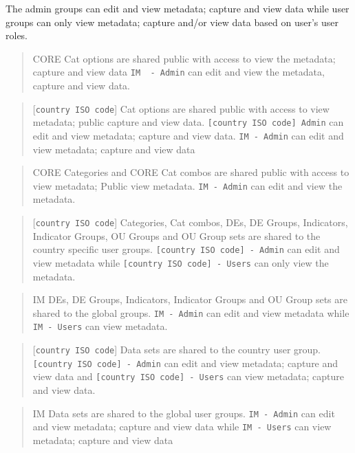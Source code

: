 \documentclass[]{book}
\begin{document}
The admin groups can edit and view metadata; capture and view data while user groups can only view metadata; capture and/or view data based on user's user roles.

\begin{quote}
CORE Cat options are shared public with access to view the metadata; capture and view data \texttt{IM\ \ -\ Admin} can edit and view the metadata, capture and view data.
\end{quote}

\begin{quote}
{[}\texttt{country\ ISO\ code}{]} Cat options are shared public with access to view metadata; public capture and view data. \texttt{{[}country\ ISO\ code{]}\ Admin} can edit and view metadata; capture and view data. \texttt{IM\ -\ Admin} can edit and view metadata; capture and view data
\end{quote}

\begin{quote}
CORE Categories and CORE Cat combos are shared public with access to view metadata; Public view metadata. \texttt{IM\ -\ Admin} can edit and view the metadata.
\end{quote}

\begin{quote}
{[}\texttt{country\ ISO\ code}{]} Categories, Cat combos, DEs, DE Groups, Indicators, Indicator Groups, OU Groups and OU Group sets are shared to the country specific user groups. \texttt{{[}country\ ISO\ code{]}\ -\ Admin} can edit and view metadata while \texttt{{[}country\ ISO\ code{]}\ -\ Users} can only view the metadata.
\end{quote}

\begin{quote}
IM DEs, DE Groups, Indicators, Indicator Groups and OU Group sets are shared to the global groups. \texttt{IM\ -\ Admin} can edit and view metadata while \texttt{IM\ -\ Users} can view metadata.
\end{quote}

\begin{quote}
{[}\texttt{country\ ISO\ code}{]} Data sets are shared to the country user group. \texttt{{[}country\ ISO\ code{]}\ -\ Admin} can edit and view metadata; capture and view data and \texttt{{[}country\ ISO\ code{]}\ -\ Users} can view metadata; capture and view data.
\end{quote}

\begin{quote}
IM Data sets are shared to the global user groups. \texttt{IM\ -\ Admin} can edit and view metadata; capture and view data while
\texttt{IM\ -\ Users} can view metadata; capture and view data
\end{quote}
\end{document}
